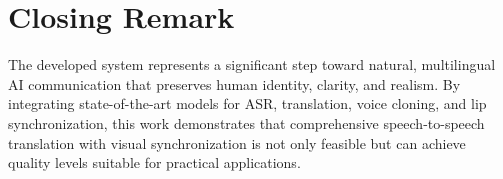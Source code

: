 \documentclass[12pt,oneside]{report}
\begin{document}
\section{Closing Remark}

The developed system represents a significant step toward natural, multilingual AI communication that preserves human identity, clarity, and realism. By integrating state-of-the-art models for ASR, translation, voice cloning, and lip synchronization, this work demonstrates that comprehensive speech-to-speech translation with visual synchronization is not only feasible but can achieve quality levels suitable for practical applications.


\nocite{*}
\printbibliography
\end{document}
